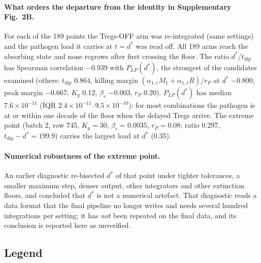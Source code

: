 \documentclass[11pt]{article}
\begin{document}
\paragraph{What orders the departure from the identity in Supplementary Fig.~2B.}
For each of the 189 points the Tregs-OFF arm was re-integrated (same settings)
and the pathogen load it carries at $t=d^\ast$ was read off. All 189 arms reach
the absorbing state and none regrows after first crossing the floor. The ratio
$d^\ast/t_{\mathrm{dip}}$ has Spearman correlation $-0.939$ with $P_{LP}(d^\ast)$,
the strongest of the candidates examined (others: $t_{\mathrm{dip}}$ $0.864$,
killing margin $(\alpha_{1,e}M_1+\alpha_{1,r}R)/r_P$ at $d^\ast$ $-0.800$,
peak margin $-0.667$; $K_g$ 0.12, $\beta_r$ $-0.003$, $r_P$ 0.20).
$P_{LP}(d^\ast)$ has median $7.6\times10^{-11}$ (IQR $2.4\times10^{-11}$--$9.5\times10^{-10}$):
for most combinations the pathogen is at or within one decade of the floor when
the delayed Tregs arrive. The extreme point (batch 2, row 745, $K_g=30$,
$\beta_r=0.0035$, $r_P=0.08$; ratio 0.297, $t_{\mathrm{dip}}-d^\ast=199.9$)
carries the largest load at $d^\ast$ (0.35).

\paragraph{Numerical robustness of the extreme point.}
An earlier diagnostic re-bisected $d^\ast$ of that point under tighter tolerances, a
smaller maximum step, denser output, other integrators and other extinction floors, and
concluded that $d^\ast$ is not a numerical artefact. That diagnostic reads a data
format that the final pipeline no longer writes and needs several hundred integrations
per setting; it has \emph{not} been repeated on the final data, and its conclusion is
reported here as unverified.

\subsection{Legend}

\end{document}

